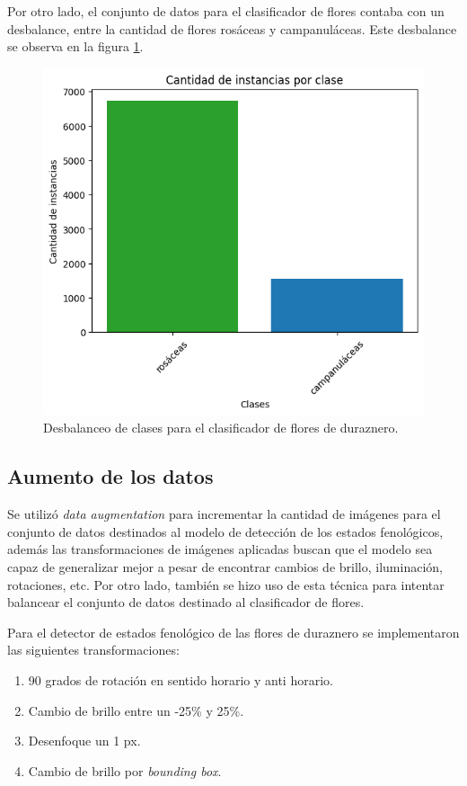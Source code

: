 Por otro lado, el conjunto de datos para el clasificador de flores contaba con un desbalance, entre la cantidad de flores rosáceas y campanuláceas. Este desbalance se observa en la figura \ref{fig:desbalanceoClass}.

\begin{figure}[ht]
	\centering
	\includegraphics[scale=.53]{./Figures/tipodeflor_desbalance.png}
	\caption{Desbalanceo de clases para el clasificador de flores de duraznero.}
	\label{fig:desbalanceoClass}
\end{figure}
\newpage
\subsection{Aumento de los datos}
\label{aumentoDatos}
Se utilizó \textit{data augmentation} para incrementar la cantidad de imágenes para el conjunto de datos destinados al modelo de detección de los estados fenológicos, además las transformaciones de imágenes aplicadas buscan que el modelo sea capaz de generalizar mejor a pesar de encontrar cambios de brillo, iluminación, rotaciones, etc. Por otro lado, también se hizo uso de esta técnica para intentar balancear el conjunto de datos destinado al clasificador de flores.

Para el detector de estados fenológico de las flores de duraznero se implementaron las siguientes transformaciones:

\begin{enumerate}
	\item 90 grados de rotación en sentido horario y anti horario.
	\item Cambio de brillo entre un -25\% y 25\%. 
	\item Desenfoque un 1 px.
	\item Cambio de brillo por \textit{bounding box}.
\end{enumerate}

